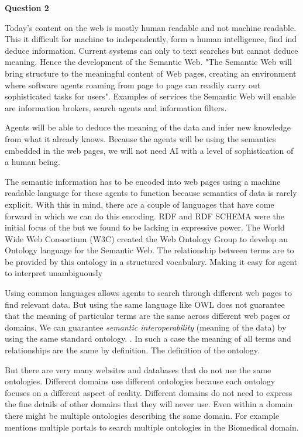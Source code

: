 \documentclass[12pt,a4paper]{article}
\begin{document}
\textbf{Question 2}
\newline

Today's content on the web is mostly human readable and not machine readable. This it difficult for machine to independently, form a human intelligence, find ind deduce information. Current systems can only to text searches but cannot deduce meaning. Hence the development of the Semantic Web. "The Semantic Web will bring structure to the meaningful content of Web pages, creating an environment where software agents roaming from page to page can readily carry out sophisticated tasks for users". \citep{lee2001} Examples of services the Semantic Web will enable are information brokers, search agents and information filters. \citep{Decker} 

Agents will be able to deduce the meaning of the data and infer new knowledge from what it already knows. Because the agents will be using the semantics embedded in the web pages, we will not need AI with a level of sophistication of a human being. \citep{lee2001}

The semantic information has to be encoded into web pages using a machine readable language for these agents to function because semantics of data is rarely explicit. \citep{Heiler1995a}  With this in mind, there are a couple of languages that have come forward in which we can do this encoding. RDF and RDF SCHEMA were the initial focus of the but we found to be lacking in expressive power. The World Wide Web Consortium (W3C) created the Web Ontology Group to develop an Ontology language for the Semantic Web. The relationship between terms are to be provided by this ontology in a structured vocabulary. Making it easy for agent to interpret unambiguously \citep{Horrocks2003}

Using common languages allows agents to search through different web pages to find relevant data. But using the same language like OWL does not guarantee that the meaning of particular terms are the same across different web pages or domains. We can guarantee \emph{semantic interoperability} (meaning of the data) by using the same standard ontology. \citep{VanDiggelen2007}. In such a case the meaning of all terms and relationships are the same by definition. The definition of the ontology.

But there are very many websites and databases that do not use the same ontologies. Different domains use different ontologies because each ontology focuses on a different aspect of reality.\citep{can} Different domains do not need to express the fine details of other domains that they will never use. Even within a domain there might be multiple ontologies describing the same domain. For example \cite{gros2014} mentions multiple portals to search multiple ontologies in the Biomedical domain.
\end{document}
